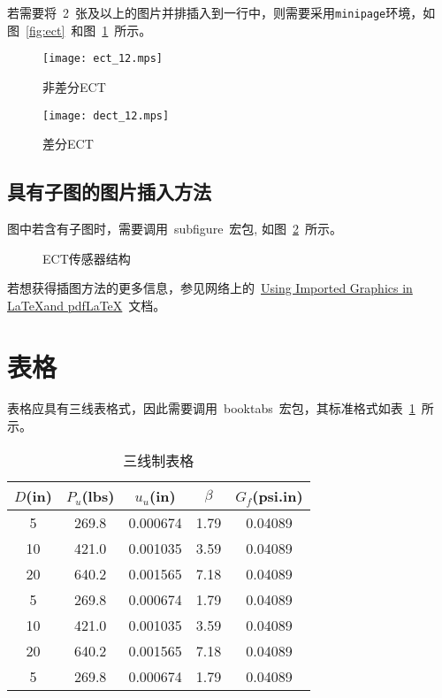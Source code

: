 若需要将~2~张及以上的图片并排插入到一行中，则需要采用\verb|minipage|环境，如图~\ref{fig:ect}~和图~\ref{fig:dect}~所示。
\begin{figure}[htbp]
\centering
\begin{minipage}{0.4\textwidth}
\centering
\texttt{[image: ect\_12.mps]}
\caption{非差分ECT}\label{fig:ect}
\end{minipage}
\hspace{0.1\textwidth}
\begin{minipage}{0.4\textwidth}
\centering
\texttt{[image: dect\_12.mps]}
\caption{差分ECT}\label{fig:dect}
\end{minipage}
\vspace{\baselineskip}
\end{figure}


\subsection{具有子图的图片插入方法}

图中若含有子图时，需要调用~subfigure~宏包, 如图~\ref{fig:subfig}~所示。
\begin{figure}[htbp]
  \centering
  \caption{ECT传感器结构}\label{fig:subfig}
\vspace{\baselineskip}
\end{figure}

若想获得插图方法的更多信息，参见网络上的~\href{ftp://ftp.tex.ac.uk/tex-archive/info/epslatex.pdf}{Using Imported Graphics in \LaTeX and pdf\LaTeX}~文档。



\section{表格}

表格应具有三线表格式，因此需要调用~booktabs~宏包，其标准格式如表~\ref{tab:ch1:tab1}~所示。
\begin{table}[htbp]
\caption{三线制表格}\label{tab:ch1:tab1}
\vspace{0.5em}\centering\wuhao
\begin{tabular}{ccccc}
\toprule[1.5pt]
$D$(in) & $P_u$(lbs) & $u_u$(in) & $\beta$ & $G_f$(psi.in)\\
\midrule[1pt]
 5 & 269.8 & 0.000674 & 1.79 & 0.04089\\
10 & 421.0 & 0.001035 & 3.59 & 0.04089\\
20 & 640.2 & 0.001565 & 7.18 & 0.04089\\
 5 & 269.8 & 0.000674 & 1.79 & 0.04089\\
10 & 421.0 & 0.001035 & 3.59 & 0.04089\\
20 & 640.2 & 0.001565 & 7.18 & 0.04089\\
 5 & 269.8 & 0.000674 & 1.79 & 0.04089\\
\bottomrule[1.5pt]
\end{tabular}
\vspace{\baselineskip}
\end{table}

